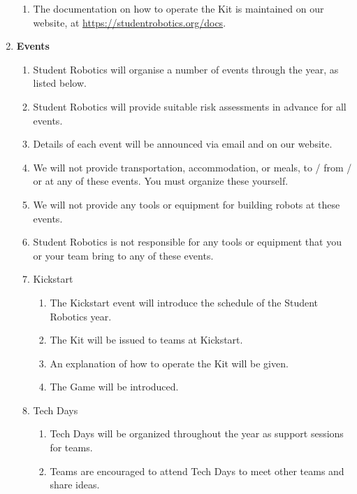 \documentclass[a4paper, 11pt]{scrartcl}
\begin{document}
\begin{enumerate}
\begin{enumerate}
\item The documentation on how to operate the Kit is maintained on our website,
at \url{https://studentrobotics.org/docs}.
\end{enumerate}

\item \textbf{Events}
\begin{enumerate}

\item Student Robotics will organise a number of events through the year, as
listed below.

\item Student Robotics will provide suitable risk assessments in advance for all events.

\item Details of each event will be announced via email and on our website.

\item We will not provide transportation, accommodation, or meals,
to / from / or at any of these events. You must organize these yourself.

\item We will not provide any tools or equipment for building robots at these
events.

\item Student Robotics is not responsible for any tools or equipment that you
or your team bring to any of these events.

\item Kickstart

\begin{enumerate}
\item The Kickstart event will introduce the schedule of the Student Robotics
year.

\item The Kit will be issued to teams at Kickstart.

\item An explanation of how to operate the Kit will be given.

\item The Game will be introduced.
\end{enumerate}

\item Tech Days

\begin{enumerate}
\item Tech Days will be organized throughout the year as support sessions for
teams.

\item Teams are encouraged to attend Tech Days to meet other teams and share
ideas.


\end{enumerate}
\end{enumerate}
\end{enumerate}
\end{document}
